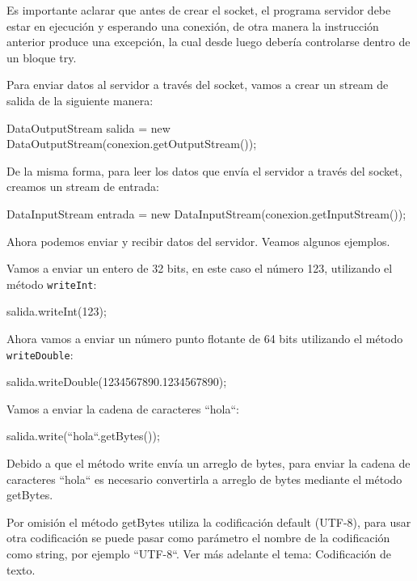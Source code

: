 Es importante aclarar que antes de crear el socket, el programa servidor debe estar en ejecución y esperando una conexión, de otra manera la instrucción anterior produce una excepción, la cual desde luego debería controlarse dentro de un bloque try.

Para enviar datos al servidor a través del socket, vamos a crear un stream de salida de la siguiente manera:

\begin{SourceCode}
DataOutputStream salida = new DataOutputStream(conexion.getOutputStream());
\end{SourceCode}

De la misma forma, para leer los datos que envía el servidor a través del socket, creamos un stream de entrada:

\begin{SourceCode}
DataInputStream entrada = new DataInputStream(conexion.getInputStream());
\end{SourceCode}

Ahora podemos enviar y recibir datos del servidor. Veamos algunos ejemplos.

Vamos a enviar un entero de 32 bits, en este caso el número 123, utilizando el método \texttt{writeInt}:

\begin{SourceCode}
salida.writeInt(123);
\end{SourceCode}

Ahora vamos a enviar un número punto flotante de 64 bits utilizando el método \texttt{writeDouble}:

\begin{SourceCode}
salida.writeDouble(1234567890.1234567890);
\end{SourceCode}

Vamos a enviar la cadena de caracteres ``hola``:

\begin{SourceCode}
salida.write(``hola``.getBytes());
\end{SourceCode}

Debido a que el método write envía un arreglo de bytes, para enviar la cadena de caracteres ``hola`` es necesario convertirla a arreglo de bytes mediante el método getBytes.

Por omisión el método getBytes utiliza la codificación default (UTF-8), para usar otra codificación se puede pasar como parámetro el nombre de la codificación como string, por ejemplo ``UTF-8``. Ver más adelante el tema: Codificación de texto.

